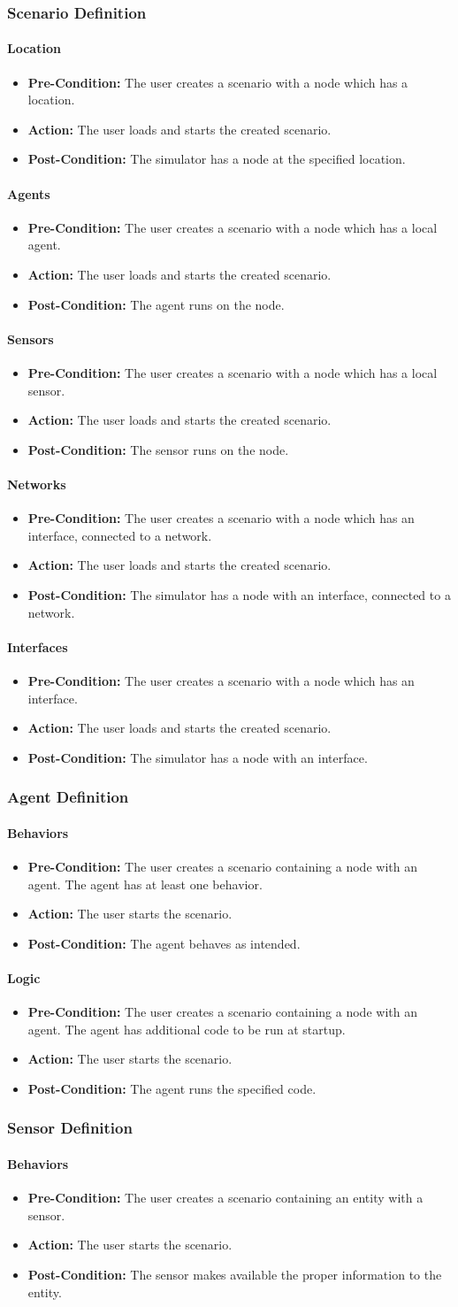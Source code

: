 \documentclass[titlepage]{article}
\newcommand{\testentry}[4]{
    \paragraph{#1}
    \begin{itemize}
        \item \textbf{Pre-Condition:} #2
        \item \textbf{Action:} #3
        \item \textbf{Post-Condition:} #4
    \end{itemize}
}
\begin{document}

\subsubsection{Scenario Definition}
    \testentry{Location}{
        The user creates a scenario with a node which has a location.
    }{
        The user loads and starts the created scenario.
    }{
        The simulator has a node at the specified location.
    }
    \testentry{Agents}{
        The user creates a scenario with a node which has a local agent.
    }{
        The user loads and starts the created scenario.
    }{
        The agent runs on the node.
    }
    \testentry{Sensors}{
        The user creates a scenario with a node which has a local sensor.
    }{
        The user loads and starts the created scenario.
    }{
        The sensor runs on the node.
    }
    \testentry{Networks}{
        The user creates a scenario with a node which has an interface, connected to a network.
    }{
        The user loads and starts the created scenario.
    }{
        The simulator has a node with an interface, connected to a network.
    }
    \testentry{Interfaces}{
        The user creates a scenario with a node which has an interface.
    }{
        The user loads and starts the created scenario.
    }{
        The simulator has a node with an interface.
    }


\subsubsection{Agent Definition}
    \testentry{Behaviors}{
        The user creates a scenario containing a node with an agent.  The agent has at least one behavior.
    }{
        The user starts the scenario.
    }{
        The agent behaves as intended.
    }
    \testentry{Logic}{
        The user creates a scenario containing a node with an agent.  The agent has additional code to be run at startup.
    }{
        The user starts the scenario.
    }{
        The agent runs the specified code.
    }

\subsubsection{Sensor Definition}
    \testentry{Behaviors}{
        The user creates a scenario containing an entity with a sensor.
    }{
        The user starts the scenario.
    }{
        The sensor makes available the proper information to the entity.
    }
\end{document}
